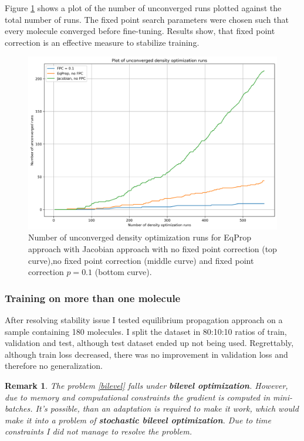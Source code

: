 \documentclass[a4paper,10.5pt]{report}
\newtheorem{remark}{Remark}
\begin{document}
Figure \ref{fig:stability} shows a plot of the number of unconverged runs plotted against the total number of runs. The fixed point search parameters were chosen such that every molecule converged before fine-tuning. Results show, that fixed point correction is an effective measure to stabilize training.
\begin{figure}[H]
 \centering
 \includegraphics[scale=0.5]{images/stability_plot.png}
 \caption{Number of unconverged density optimization runs for EqProp approach with Jacobian approach with no fixed point correction (top curve),no fixed point correction (middle curve) and  fixed point correction $p=0.1$ (bottom curve).}
 \label{fig:stability}
\end{figure}


\subsubsection{Training on more than one molecule}
After resolving stability issue I tested equilibrium propagation approach on a sample containing 180 molecules. I split the dataset in 80:10:10 ratios of train, validation and test, although test dataset ended up not being used. Regrettably, although train loss decreased, there was no improvement in validation loss and therefore no generalization.

\begin{remark}
 The problem \ref{bilevel} falls under \textbf{bilevel optimization}. However, due to memory and computational constraints the gradient is computed in mini-batches. It's possible, than an adaptation is required to make it work, which would make it into a problem of \textbf{stochastic bilevel optimization}. Due to time constraints I did not manage to resolve the problem.
\end{remark}
\end{document}
